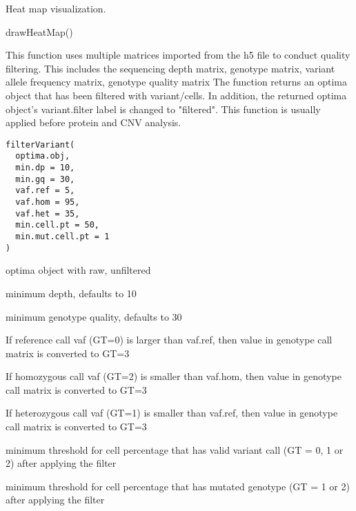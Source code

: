 \documentclass[a4paper]{book}
\begin{document}
%
\begin{Value}
Heat map visualization.
\end{Value}
%
\begin{Examples}
\begin{ExampleCode}
drawHeatMap()
\end{ExampleCode}
\end{Examples}
%
\begin{Description}\relax
This function uses multiple matrices imported from the h5 file to conduct quality filtering.
This includes the sequencing depth matrix, genotype matrix, variant allele frequency matrix, genotype quality matrix
The function returns an optima object that has been filtered with variant/cells.
In addition, the returned optima object's variant.filter label is changed to "filtered".
This function is usually applied before protein and CNV analysis.
\end{Description}
%
\begin{Usage}
\begin{verbatim}
filterVariant(
  optima.obj,
  min.dp = 10,
  min.gq = 30,
  vaf.ref = 5,
  vaf.hom = 95,
  vaf.het = 35,
  min.cell.pt = 50,
  min.mut.cell.pt = 1
)
\end{verbatim}
\end{Usage}
%
\begin{Arguments}
\begin{ldescription}
\item[\code{optima.obj}] optima object with raw, unfiltered

\item[\code{min.dp}] minimum depth, defaults to 10

\item[\code{min.gq}] minimum genotype quality, defaults to 30

\item[\code{vaf.ref}] If reference call vaf (GT=0) is larger than vaf.ref, then value in genotype call matrix is converted to GT=3

\item[\code{vaf.hom}] If homozygous call vaf (GT=2) is smaller than vaf.hom, then value in genotype call matrix is converted to GT=3

\item[\code{vaf.het}] If heterozygous call vaf (GT=1) is smaller than vaf.ref, then value in genotype call matrix is converted to GT=3

\item[\code{min.cell.pt}] minimum threshold for cell percentage that has valid variant call (GT = 0, 1 or 2) after applying the filter

\item[\code{min.mut.cell.pt}] minimum threshold for cell percentage that has mutated genotype (GT = 1 or 2) after applying the filter
\end{ldescription}
\end{Arguments}
\end{document}
